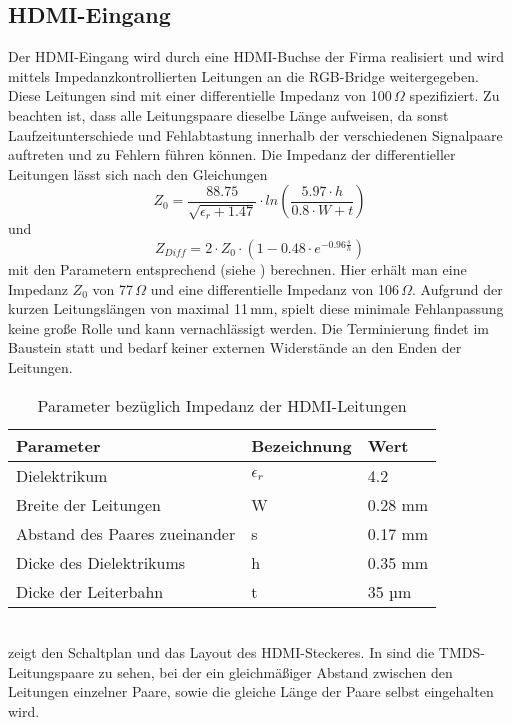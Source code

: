 \subsection{HDMI-Eingang}
\label{cha:hdmi_eingang}
Der HDMI-Eingang wird durch eine HDMI-Buchse der Firma  realisiert und wird mittels Impedanzkontrollierten Leitungen an die RGB-Bridge weitergegeben. Diese Leitungen sind mit einer differentielle Impedanz von 100\,$\Omega$ spezifiziert. Zu beachten ist, dass alle Leitungspaare dieselbe Länge aufweisen, da sonst Laufzeitunterschiede und Fehlabtastung innerhalb der verschiedenen Signalpaare auftreten und zu Fehlern führen können. Die Impedanz der differentieller Leitungen lässt sich nach den Gleichungen 
%
\begin{equation}
Z_0 = \frac{88.75}{\sqrt{\epsilon_r + 1.47}} \cdot ln\left(\frac{5.97 \cdot h}{0.8 \cdot W + t}\right)
\label{equ:z_0}
\end{equation}
%
und
%
\begin{equation}
Z_{Diff} = 2 \cdot Z_0  \cdot \left(1-0.48 \cdot e^{-0.96\frac{s}{h}}\right)
\label{equ:z_diff}
\end{equation}
%
mit den Parametern entsprechend  (siehe \cite{TI2007}) berechnen. Hier erhält man eine Impedanz $Z_0$ von 77\,$\Omega$ und eine differentielle Impedanz von 106\,$\Omega$. Aufgrund der kurzen Leitungslängen von maximal 11\,mm, spielt diese minimale Fehlanpassung keine große Rolle und kann vernachlässigt werden. Die Terminierung findet im Baustein statt und bedarf keiner externen Widerstände an den Enden der Leitungen.
\begin{table}[h]
\begin{tabular}{|p{7cm}|p{3cm}|p{3cm}|}\hline
\rowcolor{TableBackgroundColor} 
   \textbf{Parameter} & \textbf{Bezeichnung} & \textbf{Wert}	\\ \hline
    Dielektrikum 					& $\epsilon_r$	& 4.2		\\ \hline
	Breite der Leitungen  		 	& W 			& 0.28 mm	\\ \hline
	Abstand des Paares zueinander 	& s 			& 0.17 mm 	\\ \hline
	Dicke des Dielektrikums 		& h 			& 0.35 mm 	\\ \hline 
	Dicke der Leiterbahn 			& t 			& 35 µm		\\ \hline 
\end{tabular}
\caption{Parameter bezüglich Impedanz der HDMI-Leitungen}
\label{tab:z_parameter}
\end{table} \\
 zeigt den Schaltplan und das Layout des HDMI-Steckeres. In  sind die TMDS-Leitungspaare zu sehen, bei der ein gleichmäßiger Abstand zwischen den Leitungen einzelner Paare, sowie die gleiche Länge der Paare selbst eingehalten wird. 


